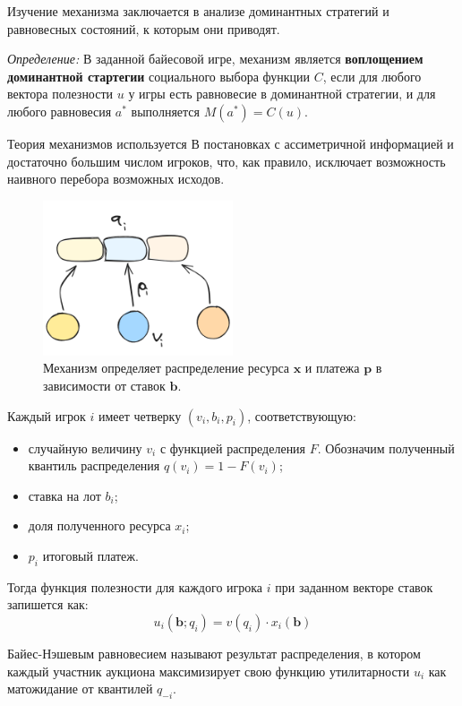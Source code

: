 Изучение механизма заключается в анализе доминантных стратегий и равновесных состояний, к которым они приводят. 

\textit{Определение:} В заданной байесовой игре, механизм является \textbf{воплощением доминантной стартегии} 
социального выбора функции $C$, если для любого вектора полезности $u$ у игры есть равновесие в 
доминантной стратегии, и для любого равновесия $a^*$ выполняется $M(a^*) = C(u)$.

Теория механизмов используется В постановках с ассиметричной информацией и достаточно большим числом игроков, что, 
как правило, исключает возможность наивного перебора возможных исходов.

\begin{figure}[h]
    \centering
    \includegraphics[width=0.5\textwidth]{assets/pedagogic/social/mech.excalidraw.png}
    \caption{Механизм определяет распределение ресурса $\mathbf{x}$ и платежа $\mathbf{p}$ в зависимости от ставок $\mathbf{b}$.}
    \label{utility}
\end{figure}

Каждый игрок $i$ имеет четверку $(v_i,b_i,p_i)$, соответствующую:
\begin{itemize}
    \item случайную величину $v_i$ с функцией распределения $F$. Обозначим полученный квантиль распределения $q(v_i) = 1 - F(v_i)$;
    \item ставка на лот $b_i$;
    \item доля полученного ресурса $x_i$;
    \item $p_i$ итоговый платеж.
\end{itemize}

Тогда функция полезности для каждого игрока $i$ при заданном векторе ставок запишется как:
\begin{equation}
    u_i(\mathbf{b};q_i) = v(q_i) \cdot x_i(\mathbf{b})   
\end{equation}

\textit{} Байес-Нэшевым равновесием называют результат распределения, в котором каждый участник аукциона
максимизирует свою функцию утилитарности $u_i$ как матожидание от квантилей $q_{-i}$.

